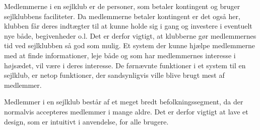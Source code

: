 Medlemmerne i en sejlklub er de personer, som betaler kontingent og bruger sejlklubbens faciliteter.  
Da medlemmerne betaler kontingent er det også her, klubben får deres indtægter til at kunne holde sig i gang og investere i eventuelt nye både, begivenheder o.l. 
Det er derfor vigtigt, at klubberne gør medlemmernes tid ved sejlklubben så god som mulig. 
Et system der kunne hjælpe medlemmerne med at finde informationer, leje både og som har medlemmernes interesse i højsædet, vil være i deres interesse. 
De førnævnte funktioner i et system til en sejlklub, er netop funktioner, der sandsynligvis ville blive brugt mest af medlemmer.

Medlemmer i en sejlklub består af et meget bredt befolkningssegment, da der normalvis accepteres medlemmer i mange aldre.
Det er derfor vigtigt at lave et design, som er intuitivt i anvendelse, for alle brugere.






